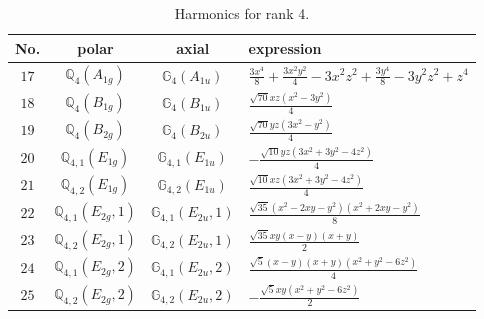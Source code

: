\documentclass[fleqn,8pt,landscape]{jsarticle}
\begin{document}
\begin{table}[ht!]
\begin{center}
\caption{Harmonics for rank 4.}
\renewcommand{\arraystretch}{1.3}
\begin{tabular}{cccl} \hline \hline
No. & polar & axial & expression \\ \hline
$ 17 $ & $ \mathbb{Q}_{4}(A_{1g}) $ & $ \mathbb{G}_{4}(A_{1u}) $ & $ \frac{3 x^{4}}{8} + \frac{3 x^{2} y^{2}}{4} - 3 x^{2} z^{2} + \frac{3 y^{4}}{8} - 3 y^{2} z^{2} + z^{4} $ \\
$ 18 $ & $ \mathbb{Q}_{4}(B_{1g}) $ & $ \mathbb{G}_{4}(B_{1u}) $ & $ \frac{\sqrt{70} x z \left(x^{2} - 3 y^{2}\right)}{4} $ \\
$ 19 $ & $ \mathbb{Q}_{4}(B_{2g}) $ & $ \mathbb{G}_{4}(B_{2u}) $ & $ \frac{\sqrt{70} y z \left(3 x^{2} - y^{2}\right)}{4} $ \\
$ 20 $ & $ \mathbb{Q}_{4,1}(E_{1g}) $ & $ \mathbb{G}_{4,1}(E_{1u}) $ & $ - \frac{\sqrt{10} y z \left(3 x^{2} + 3 y^{2} - 4 z^{2}\right)}{4} $ \\
$ 21 $ & $ \mathbb{Q}_{4,2}(E_{1g}) $ & $ \mathbb{G}_{4,2}(E_{1u}) $ & $ \frac{\sqrt{10} x z \left(3 x^{2} + 3 y^{2} - 4 z^{2}\right)}{4} $ \\
$ 22 $ & $ \mathbb{Q}_{4,1}(E_{2g},1) $ & $ \mathbb{G}_{4,1}(E_{2u},1) $ & $ \frac{\sqrt{35} \left(x^{2} - 2 x y - y^{2}\right) \left(x^{2} + 2 x y - y^{2}\right)}{8} $ \\
$ 23 $ & $ \mathbb{Q}_{4,2}(E_{2g},1) $ & $ \mathbb{G}_{4,2}(E_{2u},1) $ & $ \frac{\sqrt{35} x y \left(x - y\right) \left(x + y\right)}{2} $ \\
$ 24 $ & $ \mathbb{Q}_{4,1}(E_{2g},2) $ & $ \mathbb{G}_{4,1}(E_{2u},2) $ & $ \frac{\sqrt{5} \left(x - y\right) \left(x + y\right) \left(x^{2} + y^{2} - 6 z^{2}\right)}{4} $ \\
$ 25 $ & $ \mathbb{Q}_{4,2}(E_{2g},2) $ & $ \mathbb{G}_{4,2}(E_{2u},2) $ & $ - \frac{\sqrt{5} x y \left(x^{2} + y^{2} - 6 z^{2}\right)}{2} $ \\
 \hline \hline
\end{tabular}
\end{center}
\end{table}
\end{document}

